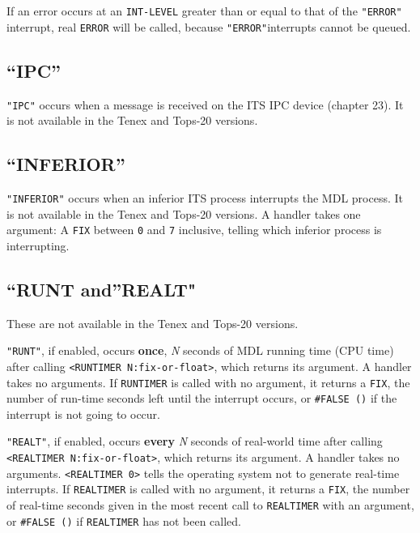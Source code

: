 \documentclass[a4paper]{scrbook}
\begin{document}
If an error occurs at an \texttt{INT-LEVEL} greater than or equal to that of the \texttt{"ERROR"} interrupt, real
\texttt{ERROR} will be called, because \texttt{"ERROR"}interrupts cannot be queued.

\subsection{\texorpdfstring{``IPC''}{21.8.12. IPC}}\label{ipc}

\texttt{"IPC"}  occurs when a message is received on the ITS IPC device
(chapter 23). It is not available in the Tenex and Tops-20 versions.

\subsection{\texorpdfstring{``INFERIOR''}{21.8.13. INFERIOR}}\label{inferior}

\texttt{"INFERIOR"}  occurs when an inferior ITS process interrupts
the MDL process. It is not available in the Tenex and Tops-20 versions. A
handler takes one argument: A \texttt{FIX} between \texttt{0} and \texttt{7} inclusive, telling which inferior process is
interrupting.

\subsection{\texorpdfstring{``RUNT and''REALT"}{21.8.14. RUNT andREALT"}}\label{runt-andrealt}

These are not available in the Tenex and Tops-20 versions.

\texttt{"RUNT"},  if enabled, occurs \textbf{once}, \emph{N} seconds of MDL running time
(CPU time) after calling \texttt{\textless{}RUNTIMER\ N:fix-or-float\textgreater{}}, which
returns its argument. A handler takes no arguments. If \texttt{RUNTIMER} is called with no argument, it returns a
\texttt{FIX}, the number of run-time seconds left until the interrupt occurs, or \texttt{\#FALSE\ ()} if the interrupt is
not going to occur.

\texttt{"REALT"},  if enabled, occurs \textbf{every} \emph{N} seconds of real-world time
after calling \texttt{\textless{}REALTIMER\ N:fix-or-float\textgreater{}}, which returns
its argument. A handler takes no arguments. \texttt{\textless{}REALTIMER\ 0\textgreater{}} tells the operating system not
to generate real-time interrupts. If \texttt{REALTIMER} is called with no argument, it returns a \texttt{FIX}, the number
of real-time seconds given in the most recent call to \texttt{REALTIMER} with an argument, or \texttt{\#FALSE\ ()} if
\texttt{REALTIMER} has not been called.
\end{document}
